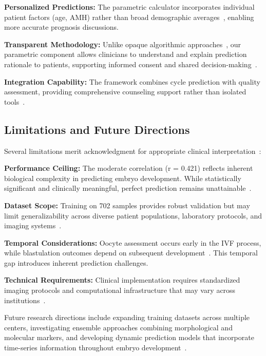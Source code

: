 \textbf{Personalized Predictions:} The parametric calculator incorporates individual patient factors (age, AMH) rather than broad demographic averages~\cite{gameiro2023understanding}, enabling more accurate prognosis discussions.

\textbf{Transparent Methodology:} Unlike opaque algorithmic approaches~\cite{rudin2019stop}, our parametric component allows clinicians to understand and explain prediction rationale to patients, supporting informed consent and shared decision-making~\cite{beauchamp2019principles}.

\textbf{Integration Capability:} The framework combines cycle prediction with quality assessment, providing comprehensive counseling support rather than isolated tools~\cite{asrm2021counselors}.

\subsection{Limitations and Future Directions}

Several limitations merit acknowledgment for appropriate clinical interpretation~\cite{varoquaux2022machine}:

\textbf{Performance Ceiling:} The moderate correlation (r = 0.421) reflects inherent biological complexity in predicting embryo development. While statistically significant and clinically meaningful, perfect prediction remains unattainable~\cite{rajkomar2019machine}.

\textbf{Dataset Scope:} Training on 702 samples provides robust validation but may limit generalizability across diverse patient populations, laboratory protocols, and imaging systems~\cite{litjens2017survey}.

\textbf{Temporal Considerations:} Oocyte assessment occurs early in the IVF process, while blastulation outcomes depend on subsequent development~\cite{meseguer2011morphokinetics}. This temporal gap introduces inherent prediction challenges.

\textbf{Technical Requirements:} Clinical implementation requires standardized imaging protocols and computational infrastructure that may vary across institutions~\cite{mortimer2015quality}.

Future research directions include expanding training datasets across multiple centers, investigating ensemble approaches combining morphological and molecular markers, and developing dynamic prediction models that incorporate time-series information throughout embryo development~\cite{meseguer2011morphokinetics}.

